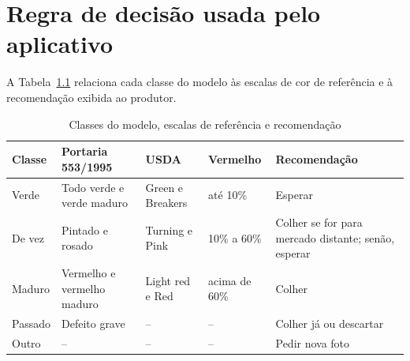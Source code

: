 \chapter{Regra de decisão usada pelo aplicativo}\label{ap:regra}

A Tabela~\ref{tab:regra} relaciona cada classe do modelo às escalas de cor de referência e à recomendação exibida ao produtor.

\begin{table}[htb]
  \ABNTEXfontereduzida
  \caption{Classes do modelo, escalas de referência e recomendação}
  \label{tab:regra}
  \begin{tabularx}{\textwidth}{lXXl X}
    \hline
    \textbf{Classe} & \textbf{Portaria 553/1995} & \textbf{USDA} & \textbf{Vermelho} & \textbf{Recomendação} \\
    \hline
    Verde & Todo verde e verde maduro & Green e Breakers & até 10\% & Esperar \\
    De vez & Pintado e rosado & Turning e Pink & 10\% a 60\% & Colher se for para mercado distante; senão, esperar \\
    Maduro & Vermelho e vermelho maduro & Light red e Red & acima de 60\% & Colher \\
    Passado & Defeito grave & -- & -- & Colher já ou descartar \\
    Outro & -- & -- & -- & Pedir nova foto \\
    \hline
  \end{tabularx}
\end{table}
